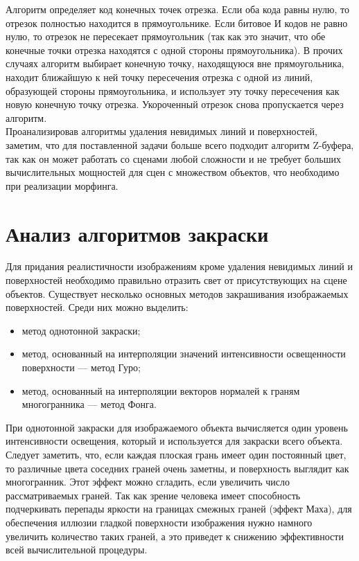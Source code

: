 Алгоритм определяет код конечных точек отрезка. Если оба кода равны нулю, то отрезок полностью находится в прямоугольнике. Если битовое И кодов не равно нулю, то отрезок не пересекает прямоугольник (так как это значит, что обе конечные точки отрезка находятся с одной стороны прямоугольника). В прочих случаях алгоритм выбирает конечную точку, находящуюся вне прямоугольника, находит ближайшую к ней точку пересечения отрезка с одной из линий, образующей стороны прямоугольника, и использует эту точку пересечения как новую конечную точку отрезка. Укороченный отрезок снова пропускается через алгоритм. \cite{REMOVE_FACES}\\

Проанализировав алгоритмы удаления невидимых линий и поверхностей, заметим, что для поставленной задачи больше всего подходит алгоритм Z-буфера, так как он может работать со сценами любой сложности и не требует больших вычислительных мощностей для сцен с множеством объектов, что необходимо при реализации морфинга.

\newpage

\section{Анализ алгоритмов закраски}

Для придания реалистичности изображениям кроме удаления невидимых линий и поверхностей необходимо правильно отразить свет от присутствующих на сцене объектов. Существует несколько основных методов закрашивания изображаемых поверхностей. Среди них можно выделить:

\begin{itemize}[label*=---]
	\item метод однотонной закраски;
	\item метод, основанный на интерполяции значений интенсивности освещенности поверхности --- метод Гуро;
	\item метод, основанный на интерполяции векторов нормалей к граням многогранника --- метод Фонга.
\end{itemize}

При однотонной закраски для изображаемого объекта вычисляется один уровень интенсивности освещения, который и используется для закраски всего объекта. Следует заметить, что, если каждая плоская грань имеет один постоянный цвет, то различные цвета соседних граней очень заметны, и поверхность выглядит как многогранник. Этот эффект можно сгладить, если увеличить число рассматриваемых граней. Так как зрение человека имеет способность подчеркивать перепады яркости на границах смежных граней (эффект Маха), для обеспечения иллюзии гладкой поверхности изображения нужно намного увеличить количество таких граней, а это приведет к снижению эффективности всей вычислительной процедуры.\\

